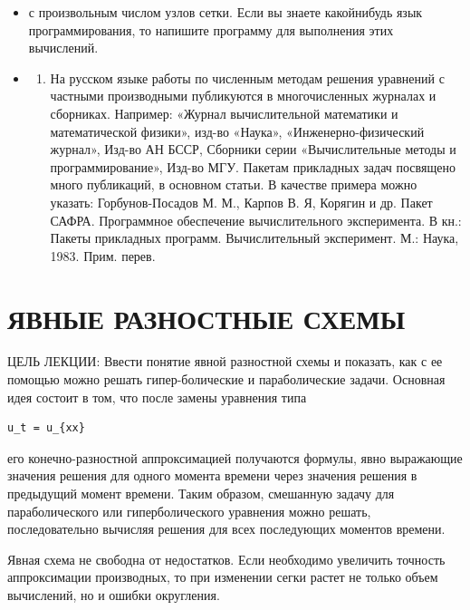 \documentclass[
  ukrainian,
]{article}
\providecommand{\tightlist}{%
  \setlength{\itemsep}{0pt}\setlength{\parskip}{0pt}}
\begin{document}
\begin{itemize}
\item
  с произвольным числом узлов сетки. Если вы знаете какойнибудь язык
  программирования, то напишите программу для выполнения этих
  вычислений.
\item
  \begin{enumerate}
  \def\labelenumi{\arabic{enumi})}
  \tightlist
  \item
    На русском языке работы по численным методам решения уравнений с
    частными производными публикуются в многочисленных журналах и
    сборниках. Например: «Журнал вычислительной математики и
    математической физики», изд-во «Наука», «Инженерно-физический
    журнал», Изд-во АН БССР, Сборники серии «Вычислительные методы и
    программирование», Изд-во МГУ. Пакетам прикладных задач посвящено
    много публикаций, в основном статьи. В качестве примера можно
    указать: Горбунов-Посадов М. М., Карпов В. Я, Корягин и др. Пакет
    САФРА. Программное обеспечение вычислительного эксперимента. В кн.:
    Пакеты прикладных программ. Вычислительный эксперимент. М.: Наука,
    1983. Прим. перев.
  \end{enumerate}
\end{itemize}

\section{ЯВНЫЕ РАЗНОСТНЫЕ
СХЕМЫ}\label{ux44fux432ux43dux44bux435-ux440ux430ux437ux43dux43eux441ux442ux43dux44bux435-ux441ux445ux435ux43cux44b}

ЦЕЛЬ ЛЕКЦИИ: Ввести понятие явной разностной схемы и показать, как с ее
помощью можно решать гипер-болические и параболические задачи. Основная
идея состоит в том, что после замены уравнения типа

\begin{verbatim}
u_t = u_{xx}
\end{verbatim}

его конечно-разностной аппроксимацией получаются формулы, явно
выражающие значения решения для одного момента времени через значения
решения в предыдущий момент времени. Таким образом, смешанную задачу для
параболического или гиперболического уравнения можно решать,
последовательно вычисляя решения для всех последующих моментов времени.

Явная схема не свободна от недостатков. Если необходимо увеличить
точность аппроксимации производных, то при изменении сегки растет не
только объем вычислений, но и ошибки округления.
\end{document}
